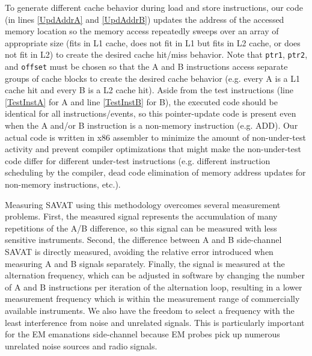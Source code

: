 To generate different cache behavior during load and store instructions, our code (in lines \ref{UpdAddrA} and \ref{UpdAddrB}) updates the address of the accessed memory location so the memory access repeatedly sweeps over an array of appropriate size (fits in L1 cache, does not fit in L1 but fits in L2 cache, or does not fit in L2) to create the desired cache hit/miss behavior. Note that \texttt{ptr1}, \texttt{ptr2}, and \texttt{offset} must be chosen so that the A and B instructions access separate groups of cache blocks to create the desired cache behavior (e.g. every A is a L1 cache hit and every B is a L2 cache hit). Aside from the test instructions (line \ref{TestInstA} for A and line \ref{TestInstB} for B), the executed code should be identical for all instructions/events, so this pointer-update code is present even when the A and/or B instruction is a non-memory instruction (e.g. ADD). Our actual code is written in x86 assembler to minimize the amount of non-under-test activity and prevent compiler optimizations that might make the non-under-test code differ for different under-test instructions (e.g. different instruction scheduling by the compiler, dead code elimination of memory address updates for non-memory instructions, etc.).

Measuring SAVAT using this methodology overcomes several measurement problems. First, the measured signal represents the accumulation of many repetitions of the A/B difference, so this signal can be measured with less sensitive instruments. Second, the difference between A and B side-channel SAVAT is directly measured, avoiding the relative error introduced when measuring A and B signals separately. Finally, the signal is measured at the alternation frequency, which can be adjusted in software by changing the number of A and B instructions per iteration of the alternation loop, resulting in a lower measurement frequency which is within the measurement range of commercially available instruments. We also have the freedom to select a frequency with the least interference from noise and unrelated signals. This is particularly important for the EM emanations side-channel because EM probes pick up numerous unrelated noise sources and radio signals.
